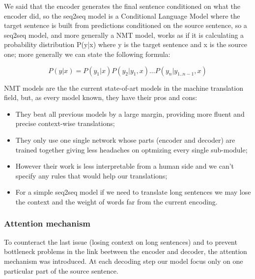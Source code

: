 We said that the encoder generates the final sentence conditioned on what the encoder did, so the seq2seq model is a Conditional Language Model where the target sentence is built from predictions conditioned on the source sentence, so a seq2seq model, and more generally a NMT model, works as if it is calculating a probability distribution P(y|x) where y is the target sentence and x is the source one; more generally we can state the following formula:
\begin{large}
$$P(y|x)=P(y_{1}|x)P(y_{2}|y_{1},x)...P(y_{n}|y_{1..n-1},x)$$
\end{large}

NMT models are the the current state-of-art models in the machine translation field, but, as every model known, they have their pros and cons:
\begin{itemize}
    \item They beat all previous models by a large margin, providing more fluent and precise context-wise translations;
    \item They only use one single network whose parts (encoder and decoder) are trained together giving less headaches on optmizing every single sub-module;
    \item However their work is less interpretable from a human side and we can't specify any rules that would help our translations;
    \item For a simple seq2seq model if we need to translate long sentences we may lose the context and the weight of words far from the current encoding.
\end{itemize}
\subsubsection{Attention mechanism}
To counteract the last issue (losing context on long sentences) and to prevent bottleneck problems in the link beetween the encoder and decoder, the attention mechanism was introduced. At each decoding step our model focus only on one particular part of the source sentence. 
\vspace{3mm}


